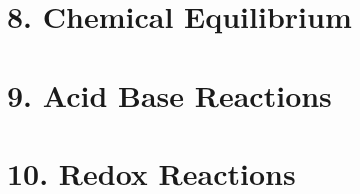 \documentclass{cheatsheet}
\begin{document}
\section{8. Chemical Equilibrium} %
	
	
	

\section{9. Acid Base Reactions} %
	
	
	
	
	

\section{10. Redox Reactions} %
	
	
	
\end{document}
